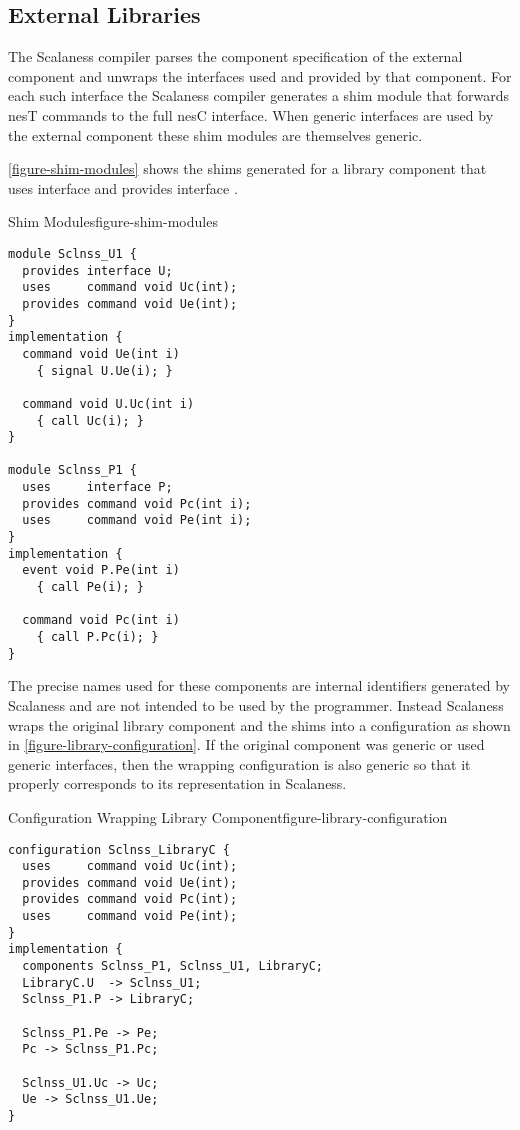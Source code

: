 
\subsection{External Libraries}
\label{section-external-libraries-implementation}

 The Scalaness compiler parses the component
specification of the external component and unwraps the interfaces used and provided by that
component. For each such interface the Scalaness compiler generates a shim module that forwards
nesT commands to the full nesC interface. When generic interfaces are used by the external
component these shim modules are themselves generic.

\autoref{figure-shim-modules} shows the shims generated for a library component
 that uses interface  and provides interface .

\singlespace
\begin{fpfig}[tbhp]{Shim Modules}{figure-shim-modules}
{
\begin{lstlisting}[language=nesC]
module Sclnss_U1 {
  provides interface U;
  uses     command void Uc(int);
  provides command void Ue(int);
}
implementation {
  command void Ue(int i)
    { signal U.Ue(i); }

  command void U.Uc(int i)
    { call Uc(i); }
}

module Sclnss_P1 {
  uses     interface P;
  provides command void Pc(int i);
  uses     command void Pe(int i);
}
implementation {
  event void P.Pe(int i)
    { call Pe(i); }

  command void Pc(int i)
    { call P.Pc(i); }
}
\end{lstlisting}
}
\end{fpfig}
\primaryspacing

The precise names used for these components are internal identifiers generated by Scalaness and
are not intended to be used by the programmer. Instead Scalaness wraps the original library
component and the shims into a configuration as shown in \autoref{figure-library-configuration}.
If the original component was generic or used generic interfaces, then the wrapping
configuration is also generic so that it properly corresponds to its representation in
Scalaness.

\singlespace
\begin{fpfig}[tbhp]{Configuration Wrapping Library Component}{figure-library-configuration}
{
\begin{lstlisting}[language=nesC]
configuration Sclnss_LibraryC {
  uses     command void Uc(int);
  provides command void Ue(int);
  provides command void Pc(int);
  uses     command void Pe(int);
}
implementation {
  components Sclnss_P1, Sclnss_U1, LibraryC;
  LibraryC.U  -> Sclnss_U1;
  Sclnss_P1.P -> LibraryC;

  Sclnss_P1.Pe -> Pe;
  Pc -> Sclnss_P1.Pc;
  
  Sclnss_U1.Uc -> Uc;
  Ue -> Sclnss_U1.Ue;
}
\end{lstlisting}
}
\end{fpfig}
\primaryspacing

